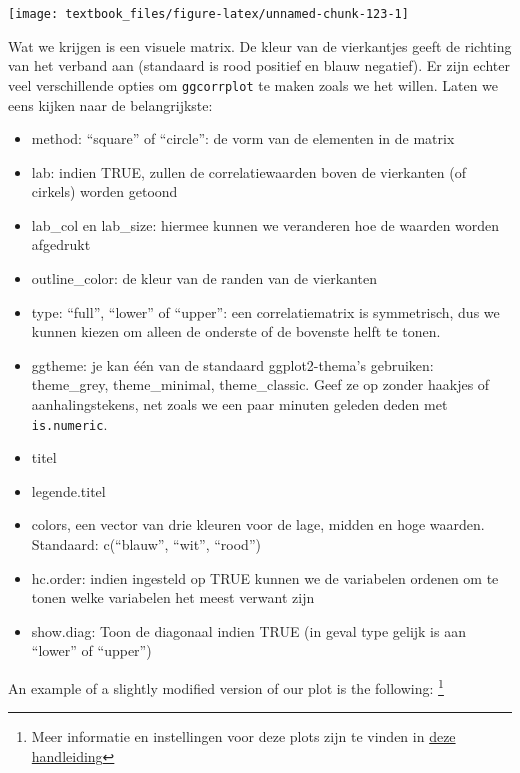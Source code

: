 \documentclass[]{tufte-book}
\providecommand{\tightlist}{%
  \setlength{\itemsep}{0pt}\setlength{\parskip}{0pt}}
\begin{document}
\texttt{[image: textbook\_files/figure-latex/unnamed-chunk-123-1]}

Wat we krijgen is een visuele matrix. De kleur van de vierkantjes geeft de richting van het verband aan (standaard is rood positief en blauw negatief). Er zijn echter veel verschillende opties om \texttt{ggcorrplot} te maken zoals we het willen. Laten we eens kijken naar de belangrijkste:

\begin{itemize}
\tightlist
\item
  method: ``square'' of ``circle'': de vorm van de elementen in de matrix
\item
  lab: indien TRUE, zullen de correlatiewaarden boven de vierkanten (of cirkels) worden getoond
\item
  lab\_col en lab\_size: hiermee kunnen we veranderen hoe de waarden worden afgedrukt
\item
  outline\_color: de kleur van de randen van de vierkanten
\item
  type: ``full'', ``lower'' of ``upper'': een correlatiematrix is symmetrisch, dus we kunnen kiezen om alleen de onderste of de bovenste helft te tonen.
\item
  ggtheme: je kan één van de standaard ggplot2-thema's gebruiken: theme\_grey, theme\_minimal, theme\_classic. Geef ze op zonder haakjes of aanhalingstekens, net zoals we een paar minuten geleden deden met \texttt{is.numeric}.
\item
  titel
\item
  legende.titel
\item
  colors, een vector van drie kleuren voor de lage, midden en hoge waarden. Standaard: c(``blauw'', ``wit'', ``rood'')
\item
  hc.order: indien ingesteld op TRUE kunnen we de variabelen ordenen om te tonen welke variabelen het meest verwant zijn
\item
  show.diag: Toon de diagonaal indien TRUE (in geval type gelijk is aan ``lower'' of ``upper'')
\end{itemize}

An example of a slightly modified version of our plot is the following: \footnote{Meer informatie en instellingen voor deze plots zijn te vinden in \href{https://github.com/kassambara/ggcorrplot}{deze handleiding}}
\end{document}
